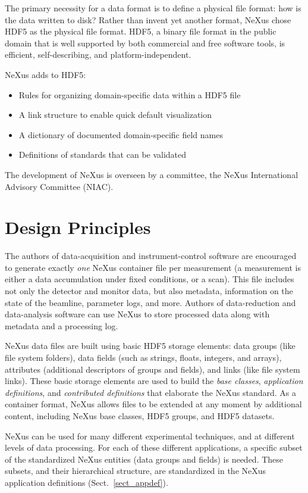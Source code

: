 \documentclass[%
 aip,
rsi,
 amsmath,amssymb,
 reprint,%
]{revtex4-1}
\begin{document}
The primary necessity for a data format is to define a physical file format: how is the data written to disk? Rather than invent
yet another format, NeXus chose HDF5\cite{hdf5} as the physical file format. 
HDF5, a binary file format in the public domain that is well supported by both commercial and free software tools, 
is efficient, self-describing, and platform-independent.

NeXus adds to HDF5:
\begin{itemize}
\item Rules for organizing domain-specific data within a HDF5 file
\item A link structure to enable quick default visualization
\item A dictionary of documented domain-specific field names
\item Definitions of standards that can be validated
\end{itemize}

The development of NeXus is overseen by a committee, the NeXus International Advisory Committee (NIAC)\cite{niac}.

\section{Design Principles}

The authors of data-acquisition and instrument-control software are encouraged to generate exactly \emph{one} NeXus container file per measurement
(a measurement is either a data accumulation under fixed conditions,
or a scan).
This file includes not only the detector and monitor data,
but also metadata, information on the state of the beamline, parameter logs, and more.
Authors of data-reduction and data-analysis software can use NeXus to
store processed data along with metadata and a processing log.

NeXus data files are built using basic HDF5 storage elements: 
data groups (like file system folders), 
data fields (such as strings, floats, integers, and arrays), 
attributes (additional descriptors of groups and fields), 
and links (like file system links).  These basic storage elements are used to
build the \emph{base classes}, \emph{application definitions},
and \emph{contributed definitions} that elaborate the NeXus standard.
As a container format, NeXus allows files to be extended at any moment by
additional content, including NeXus base classes, HDF5 groups, and HDF5 datasets.

NeXus can be used for many different experimental techniques,
and at different levels of data processing.
For each of these different applications,
a specific subset of the standardized NeXus entities 
(data groups and fields) is needed.
These subsets, and their hierarchical structure, are standardized
in the NeXus application definitions (Sect.~\ref{sect_appdef}).
\end{document}
